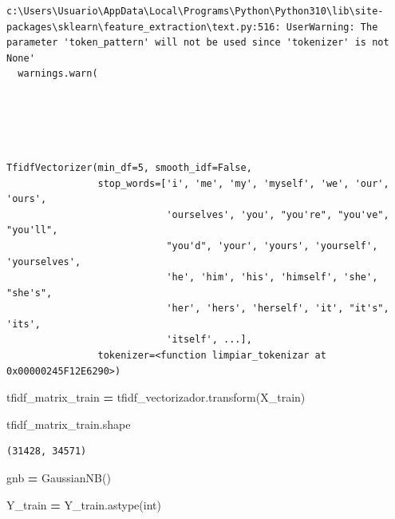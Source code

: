 \documentclass[
  11pt,
  a4paper,
]{article}
\newenvironment{Shaded}{\begin{snugshade}}{\end{snugshade}}
\newcommand{\NormalTok}[1]{#1}
\newcommand{\OperatorTok}[1]{\textcolor[rgb]{0.81,0.36,0.00}{\textbf{#1}}}
\newcommand{\StringTok}[1]{\textcolor[rgb]{0.31,0.60,0.02}{#1}}
\begin{document}
\begin{verbatim}
c:\Users\Usuario\AppData\Local\Programs\Python\Python310\lib\site-packages\sklearn\feature_extraction\text.py:516: UserWarning: The parameter 'token_pattern' will not be used since 'tokenizer' is not None'
  warnings.warn(





TfidfVectorizer(min_df=5, smooth_idf=False,
                stop_words=['i', 'me', 'my', 'myself', 'we', 'our', 'ours',
                            'ourselves', 'you', "you're", "you've", "you'll",
                            "you'd", 'your', 'yours', 'yourself', 'yourselves',
                            'he', 'him', 'his', 'himself', 'she', "she's",
                            'her', 'hers', 'herself', 'it', "it's", 'its',
                            'itself', ...],
                tokenizer=<function limpiar_tokenizar at 0x00000245F12E6290>)
\end{verbatim}

\begin{Shaded}
\begin{Highlighting}[]
\NormalTok{tfidf\_matrix\_train }\OperatorTok{=}\NormalTok{ tfidf\_vectorizador.transform(X\_train)}
\end{Highlighting}
\end{Shaded}

\begin{Shaded}
\begin{Highlighting}[]
\NormalTok{tfidf\_matrix\_train.shape}
\end{Highlighting}
\end{Shaded}

\begin{verbatim}
(31428, 34571)
\end{verbatim}

\begin{Shaded}
\begin{Highlighting}[]
\NormalTok{gnb }\OperatorTok{=}\NormalTok{ GaussianNB()}
\end{Highlighting}
\end{Shaded}

\begin{Shaded}
\begin{Highlighting}[]
\NormalTok{Y\_train }\OperatorTok{=}\NormalTok{ Y\_train.astype(}\StringTok{\textquotesingle{}int\textquotesingle{}}\NormalTok{)}
\end{Highlighting}
\end{Shaded}
\end{document}
